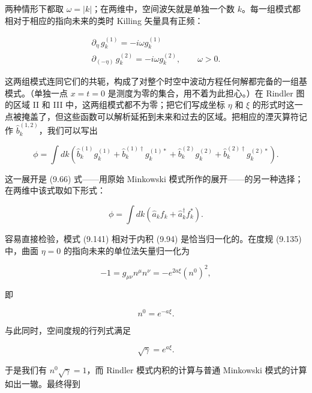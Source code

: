 两种情形下都取 $\omega=|k|$；在两维中，空间波矢就是单独一个数 $k$。每一组模式都相对于相应的指向未来的类时 Killing 矢量具有正频：

\begin{gather*}
\partial_{\eta}\, g_{k}^{(1)} = -i\omega g_{k}^{(1)} \\
\partial_{(-\eta)}\, g_{k}^{(2)} = -i\omega g_{k}^{(2)}, \qquad \omega > 0.
\tag{9.142}
\end{gather*}

这两组模式连同它们的共轭，构成了对整个时空中波动方程任何解都完备的一组基模式。（单独一点 $x=t=0$ 是测度为零的集合，用不着为此担心。）在 Rindler 图的区域 II 和 III 中，这两组模式都不为零；把它们写成坐标 $\eta$ 和 $\xi$ 的形式时这一点被掩盖了，但这些函数可以解析延拓到未来和过去的区域。把相应的湮灭算符记作 $\hat{b}_{k}^{(1,2)}$，我们可以写出

\begin{equation*}
\phi = \int dk\left(\hat{b}_{k}^{(1)}g_{k}^{(1)} + \hat{b}_{k}^{(1)\dagger}g_{k}^{(1)*} + \hat{b}_{k}^{(2)}g_{k}^{(2)} + \hat{b}_{k}^{(2)\dagger}g_{k}^{(2)*}\right).
\tag{9.143}
\end{equation*}

这一展开是 (9.66) 式——用原始 Minkowski 模式所作的展开——的另一种选择；在两维中该式取如下形式：

\begin{equation*}
\phi = \int dk\left(\hat{a}_{k}f_{k} + \hat{a}_{k}^{\dagger}f_{k}^{*}\right).
\tag{9.144}
\end{equation*}

容易直接检验，模式 (9.141) 相对于内积 (9.94) 是恰当归一化的。在度规 (9.135) 中，曲面 $\eta=0$ 的指向未来的单位法矢量归一化为

\begin{equation*}
-1 = g_{\mu\nu}n^{\mu}n^{\nu} = -e^{2a\xi}(n^{0})^{2},
\tag{9.145}
\end{equation*}

即

\begin{equation*}
n^{0} = e^{-a\xi}.
\tag{9.146}
\end{equation*}

与此同时，空间度规的行列式满足

\begin{equation*}
\sqrt{\gamma} = e^{a\xi}.
\tag{9.147}
\end{equation*}

于是我们有 $n^{0}\sqrt{\gamma}=1$，而 Rindler 模式内积的计算与普通 Minkowski 模式的计算如出一辙。最终得到

